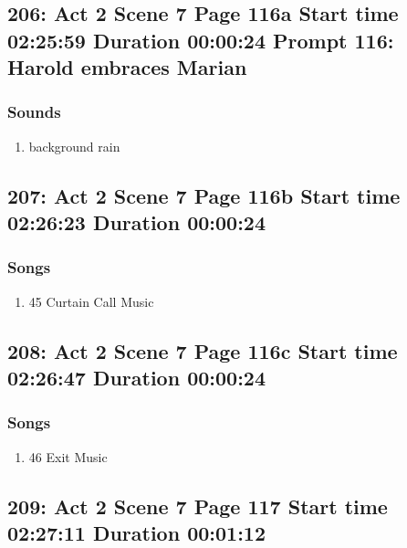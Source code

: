 \subsection{206: Act 2 Scene 7 Page 116a Start time 02:25:59 Duration 00:00:24 Prompt 116: Harold embraces Marian}
\subsubsection{Sounds}
\begin{enumerate}
\item background rain
\end{enumerate}
\subsection{207: Act 2 Scene 7 Page 116b Start time 02:26:23 Duration 00:00:24}
\subsubsection{Songs}
\begin{enumerate}
\item 45 Curtain Call Music
\end{enumerate}
\subsection{208: Act 2 Scene 7 Page 116c Start time 02:26:47 Duration 00:00:24}
\subsubsection{Songs}
\begin{enumerate}
\item 46 Exit Music
\end{enumerate}
\subsection{209: Act 2 Scene 7 Page 117 Start time 02:27:11 Duration 00:01:12}

